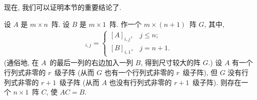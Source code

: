 \documentclass[../libro.tex]{subfiles}
\begin{document}
现在, 我们可以证明本节的重要结论了.

\begin{theorem}
    设 \(A\) 是 \(m \times n\)~阵.
    设 \(B\) 是 \(m \times 1\)~阵.
    作一个 \(m \times (n+1)\)~阵 \(G\),
    其中,
    \begin{align*}
        [G]_{i,j} =
        \begin{cases}
            [A]_{i,j}, & j \leq n;  \\
            [B]_{i,1}, & j = n + 1.
        \end{cases}
    \end{align*}
    (通俗地, 在 \(A\)~的最后一列的右边加入一列 \(B\),
    得到尺寸较大的阵 \(G\).)
    设
    \(A\) 有一个行列式非零的 \(r\)~级子阵
    (从而 \(G\) 也有一个行列式非零的 \(r\)~级子阵),
    但 \(G\) 没有行列式非零的 \(r+1\)~级子阵
    (从而 \(A\) 也没有行列式非零的 \(r+1\)~级子阵).
    则存在一个 \(n \times 1\)~阵 \(C\),
    使 \(AC = B\).
\end{theorem}
\end{document}
